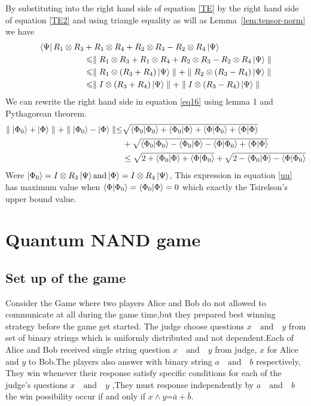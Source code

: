 By substituting into the right hand side of equation \ref{TE} by the right hand side of equation \ref{TE2} and using   triangle equality as will as Lemma~\ref{lem:tensor-norm} we have
\begin{align}
\bra{\Psi}R_1\otimes R_3 &+ R_1\otimes R_4+R_2\otimes R_3 -R_2\otimes R_4\ket{\Psi} \\
&\leqslant  \parallel R_1\otimes R_3+ R_1\otimes R_4+R_2\otimes R_3 -R_2\otimes R_4\ket{\Psi}\parallel \nonumber\\
&\leqslant \parallel R_1\otimes (R_3+ R_4)\ket{\Psi}\parallel +\parallel R_2\otimes( R_3 - R_4)\ket{\Psi}\parallel\nonumber \\
&\leqslant \parallel I\otimes (R_3+ R_4)\ket{\Psi}\parallel +\parallel I\otimes( R_3 - R_4)\ket{\Psi}\parallel\label{eq16}
\end{align}
We can rewrite the right hand side in equation \ref{eq16} using lemma 1 and Pythagorean theorem.
\begin{align}
\parallel \ket{\Phi_0}+ \ket{\Phi}\parallel +\parallel \ket{\Phi_0}- \ket{\Phi}\parallel \leq &\sqrt{\bra{\Phi_0}\ket{\Phi_0}+\bra{\Phi_0}\ket{\Phi}+\bra{\Phi}\ket{\Phi_0}+\bra{\Phi}\ket{\Phi}}\nonumber\\
&+\sqrt{\bra{\Phi_0}\ket{\Phi_0}-\bra{\Phi_0}\ket{\Phi}-\bra{\Phi}\ket{\Phi_0}+\bra{\Phi}\ket{\Phi}}\nonumber\\
 &\leq \sqrt{2+\bra{\Phi_0}\ket{\Phi}+\bra{\Phi}\ket{\Phi_0}}+\sqrt{2-\bra{\Phi_0}\ket{\Phi}-\bra{\Phi}\ket{\Phi_0}}\label{uu}
\end{align}
Were $\ket{\Phi_0}=I\otimes R_3\ket{\Psi} \text{and}\ket{\Phi}=I\otimes R_4\ket{\Psi}$, This expression in equation \ref{uu} has maximum value when $\bra{\Phi}\ket{\Phi_0}=\bra{\Phi_0}\ket{\Phi}=0$ which exactly the Tsirelson’s  upper bound value.

\section{Quantum NAND game}

\subsection{Set up of the game} 
Consider the Game where two players Alice and Bob  do not allowed to  communicate
at all during the game time,but they prepared  best winning strategy  before the game get started\citep{ANDJIGA1988189}. The judge choose  questions $x \quad \text{and} \quad y$  from set of binary strings which is uniformly  distributed and not dependent.Each of Alice and Bob received single string question $x \quad \text{and} \quad y$ from  judge, $x$ for Alice and $y$ to Bob.The players also answer with binary string  $a\quad \text{and}\quad  b$ respectively, They win whenever their response satisfy specific conditions for each of the judge's questions $x \quad \text{and} \quad y$ ,They must response independently by  $a \quad \text{and} \quad b$ the win possibility occur  if and only if $x \wedge y$=$\bar{a}+\bar{b}$.
